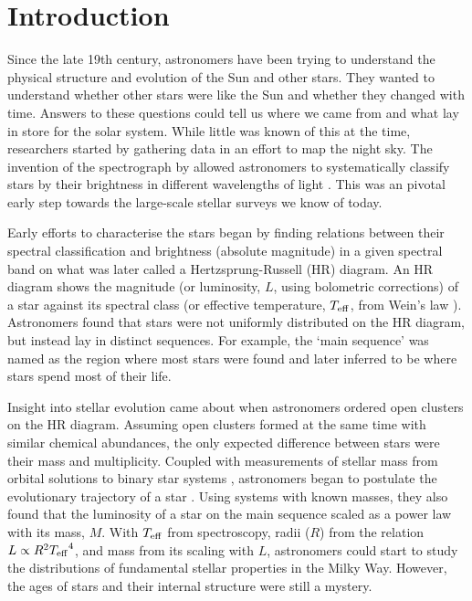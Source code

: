 %
%
%
%
%
\chapter{Introduction}

Since the late 19th century, astronomers have been trying to understand the physical structure and evolution of the Sun and other stars. They wanted to understand whether other stars were like the Sun and whether they changed with time. Answers to these questions could tell us where we came from and what lay in store for the solar system. While little was known of this at the time, researchers started by gathering data in an effort to map the night sky. The invention of the spectrograph by \citet{Draper1874} allowed astronomers to systematically classify stars by their brightness in different wavelengths of light \citep{Maury.Pickering1897}. This was an pivotal early step towards the large-scale stellar surveys we know of today.


Early efforts to characterise the stars began by finding relations between their spectral classification and brightness (absolute magnitude) in a given spectral band \citep[e.g.][]{Russell1914} on what was later called a Hertzsprung-Russell (HR) diagram. An HR diagram shows the magnitude (or luminosity, \(L\), using bolometric corrections) of a star against its spectral class (or effective temperature, \({T_\mathrm{eff}}\), from Wein's law \needcite). Astronomers found that stars were not uniformly distributed on the HR diagram, but instead lay in distinct sequences. For example, the `main sequence' was named as the region where most stars were found and later inferred to be where stars spend most of their life.

Insight into stellar evolution came about when astronomers ordered open clusters on the HR diagram. Assuming open clusters formed at the same time with similar chemical abundances, the only expected difference between stars were their mass and multiplicity. Coupled with measurements of stellar mass from orbital solutions to binary star systems , astronomers began to postulate the evolutionary trajectory of a star \needcite. Using systems with known masses, they also found that the luminosity of a star on the main sequence scaled as a power law with its mass, \(M\). With \({T_\mathrm{eff}}\) from spectroscopy, radii (\(R\)) from the relation \(L \propto R^2 {T_\mathrm{eff}}^4\), and mass from its scaling with \(L\), astronomers could start to study the distributions of fundamental stellar properties in the Milky Way. However, the ages of stars and their internal structure were still a mystery.

